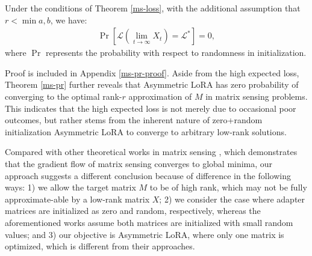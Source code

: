 \begin{theorem}
    \label{ms-pr}
    Under the conditions of Theorem \ref{ms-loss}, with the additional assumption that $r < \min{a,b}$, we have:
    \begin{align*}
        \operatorname{Pr}\left[\mathcal{L}(\lim_{t\to\infty}X_t)=\mathcal{L}^*\right]=0,
    \end{align*}
    where $\operatorname{Pr}$ represents the probability with respect to randomness in initialization. 
\end{theorem}
Proof is included in Appendix \ref{ms-pr-proof}. Aside from the high expected loss, Theorem \ref{ms-pr} further reveals that Asymmetric LoRA has zero probability of converging to the optimal rank-$r$ approximation of $M$ in matrix sensing problems. This indicates that the high expected loss is not merely due to occasional poor outcomes, but rather stems from the inherent nature of zero+random initialization Asymmetric LoRA to converge to arbitrary low-rank solutions. 

Compared with other theoretical works in matrix sensing \cite{tarmoun2021understanding, min2021explicit, ye2021global, wind2023asymmetric}, which demonstrates that the gradient flow of matrix sensing converges to global minima, our approach suggests a different conclusion because of difference in the following ways: 1) we allow the target matrix $M$ to be of high rank, which may not be fully approximate-able by a low-rank matrix $X$; 2) we consider the case where adapter matrices are initialized as zero and random, respectively, whereas the aforementioned works assume both matrices are initialized with small random values; and 3) our objective is Asymmetric LoRA, where only one matrix is optimized, which is different from their approaches. 


